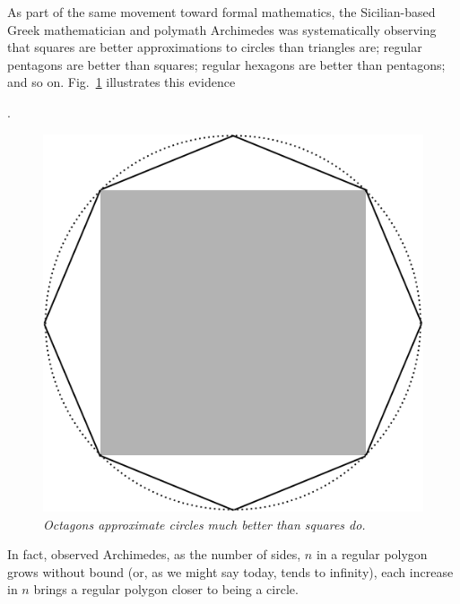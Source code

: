 As part of the same movement toward formal mathematics, the
Sicilian-based Greek mathematician and polymath Archimedes
%
was systematically observing that squares are better approximations to
circles than triangles are; regular pentagons are better than squares;
regular hexagons are better than pentagons; and so on.  
Fig.~\ref{fig:approxcircle} illustrates this evidence
.
\begin{figure}[htb]
\begin{center}
       \includegraphics[scale=0.25]{FiguresArithmetic/ApproxCircle}
\caption{{\it Octagons approximate circles much better than squares do.}
\label{fig:approxcircle}}
\end{center}
\end{figure}
In fact, observed Archimedes, as the number of sides, $n$ in a regular
polygon grows without bound (or, as we might say today, tends to
infinity), each increase in $n$ brings a regular polygon closer to
being a circle.

